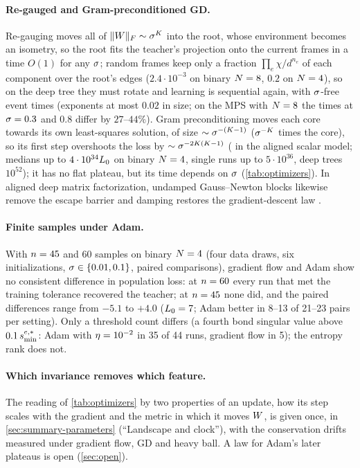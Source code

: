 \paragraph{Re-gauged and Gram-preconditioned GD.}
\derived{} \empirical{} Re-gauging moves all of $\lVert W\rVert_{F}\sim\sigma^K$ into the root, whose environment becomes an
isometry, so the root fits the teacher's projection onto the current frames in a time $O(1)$ for any $\sigma$; random
frames keep only a fraction $\prod_e\chi/d^{n_e}$ of each component over the root's edges ($2.4\cdot10^{-3}$ on binary
$N=8$, $0.2$ on $N=4$), so on the deep tree they must rotate and learning is sequential again, with $\sigma$-free event
times (exponents at most $0.02$ in size; on the MPS with $N=8$ the times at $\sigma=0.3$ and $0.8$ differ by
$27$--$44\%$). Gram preconditioning moves each core towards its own least-squares solution, of size
$\sim\sigma^{-(K-1)}$ ($\sigma^{-K}$ times the core), so its first step overshoots the loss by $\sim\sigma^{-2K(K-1)}$
(\derived{} in the aligned scalar model; medians up to $4\cdot10^{34}L_0$ on binary $N=4$, single runs up to
$5\cdot10^{36}$, deep trees $10^{52}$); it has no flat plateau, but its time depends on $\sigma$ (\cref{tab:optimizers}).
In aligned deep matrix factorization, undamped Gauss--Newton blocks likewise remove the escape barrier and damping
restores the gradient-descent law .

\paragraph{Finite samples under Adam.}
\empirical{} With $n=45$ and $60$ samples on binary $N=4$ (four data draws, six initializations,
$\sigma\in\{0.01,0.1\}$, paired comparisons), gradient flow and Adam show no consistent difference in population loss:
at $n=60$ every run that met the training tolerance recovered the teacher; at $n=45$ none did, and the paired
differences range from $-5.1$ to $+4.0$ ($L_0=7$; Adam better in 8--13 of 21--23 pairs per setting). Only a
threshold count differs (a fourth bond singular value above $0.1\,s^{e,*}_{\min}$: Adam with $\eta=10^{-2}$ in 35 of 44
runs, gradient flow in 5); the entropy rank does not.

\paragraph{Which invariance removes which feature.}
The reading of \cref{tab:optimizers} by two properties of an update, how its step scales with the gradient and the
metric in which it moves $W$, is given once, in \cref{sec:summary-parameters} (``Landscape and clock''), with the
conservation drifts measured under gradient flow, GD and heavy ball. A law for Adam's later plateaus is open
(\cref{sec:open}).


